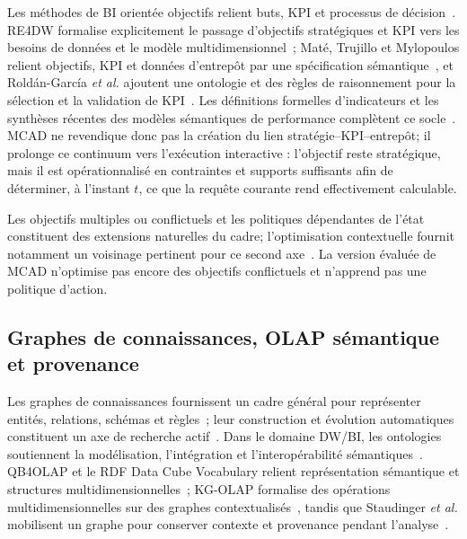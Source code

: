 \documentclass[journal]{IEEEtran}
\begin{document}
Les méthodes de BI orientée objectifs relient buts, KPI et processus de décision~\cite{Pourshahid2014}. RE4DW formalise explicitement le passage d'objectifs stratégiques et KPI vers les besoins de données et le modèle multidimensionnel~\cite{NasiriAhmedWrembelZimanyi2017}; Maté, Trujillo et Mylopoulos relient objectifs, KPI et données d'entrepôt par une spécification sémantique~\cite{MateTrujilloMylopoulos2017}, et Roldán-García \emph{et al.} ajoutent une ontologie et des règles de raisonnement pour la sélection et la validation de KPI~\cite{RoldanGarciaEtAl2021}. Les définitions formelles d'indicateurs et les synthèses récentes des modèles sémantiques de performance complètent ce socle~\cite{DiamantiniKPISurvey2025}. MCAD ne revendique donc pas la création du lien stratégie--KPI--entrepôt; il prolonge ce continuum vers l'exécution interactive : l'objectif reste stratégique, mais il est opérationnalisé en contraintes et supports suffisants afin de déterminer, à l'instant $t$, ce que la requête courante rend effectivement calculable.

Les objectifs multiples ou conflictuels et les politiques dépendantes de l'état constituent des extensions naturelles du cadre; l'optimisation contextuelle fournit notamment un voisinage pertinent pour ce second axe~\cite{SadanaEJOR2025}. La version évaluée de MCAD n'optimise pas encore des objectifs conflictuels et n'apprend pas une politique d'action.

\subsection{Graphes de connaissances, OLAP sémantique et provenance}

Les graphes de connaissances fournissent un cadre général pour représenter entités, relations, schémas et règles~\cite{HoganKGSurvey2021}; leur construction et évolution automatiques constituent un axe de recherche actif~\cite{ZhongKGC2024}. Dans le domaine DW/BI, les ontologies soutiennent la modélisation, l'intégration et l'interopérabilité sémantiques~\cite{AntunesCardosoBarateiro2022}. QB4OLAP et le RDF Data Cube Vocabulary relient représentation sémantique et structures multidimensionnelles~\cite{Etcheverry2014,W3CDataCube2014}; KG-OLAP formalise des opérations multidimensionnelles sur des graphes contextualisés~\cite{SchuetzSerafiniBozzato2021}, tandis que Staudinger \emph{et al.} mobilisent un graphe pour conserver contexte et provenance pendant l'analyse~\cite{StaudingerSchuetzSchrefl2025}.
\end{document}
